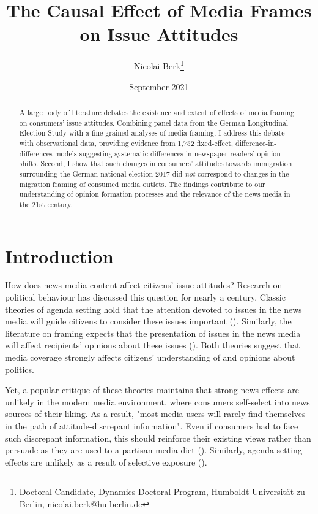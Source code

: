 \documentclass{article}
\title{The Causal Effect of Media Frames on Issue Attitudes}
\author{Nicolai Berk\footnote{Doctoral Candidate, Dynamics Doctoral Program, Humboldt-Universität zu Berlin, \href{mailto:nicolai.berk@hu-berlin.de}{nicolai.berk@hu-berlin.de}}}
\date{September 2021}
\begin{document}
\maketitle


\begin{abstract}
    A large body of literature debates the existence and extent of effects of media framing on consumers' issue attitudes. Combining panel data from the German Longitudinal Election Study with a fine-grained analyses of media framing, I address this debate with observational data, providing evidence from 1,752 fixed-effect, difference-in-differences models suggesting systematic differences in newspaper readers' opinion shifts. Second, I show that such changes in consumers' attitudes towards immigration surrounding the German national election 2017 did \textit{not} correspond to changes in the migration framing of consumed media outlets. The findings contribute to our understanding of opinion formation processes and the relevance of the news media in the 21st century.
\end{abstract}


\section{Introduction}


How does news media content affect citizens' issue attitudes? Research on political behaviour has discussed this question for nearly a century. Classic theories of agenda setting hold that the attention devoted to issues in the news media will guide citizens to consider these issues important (\cite{McCombs1972}). Similarly, the literature on framing expects that the presentation of issues in the news media will affect recipients' opinions about these issues (\cite{Nelson1997}). Both theories suggest that media coverage strongly affects citizens' understanding of and opinions about politics.

Yet, a popular critique of these theories maintains that strong news effects are unlikely in the modern media environment, where consumers self-select into news sources of their liking. As a result, "most media users will rarely find themselves in the path of attitude-discrepant information". Even if consumers had to face such discrepant information, this should reinforce their existing views rather than persuade as they are used to a partisan media diet (\cite[724f]{Bennett2008}). Similarly, agenda setting effects are unlikely as a result of selective exposure (\cite{Lau2021}).
\end{document}
